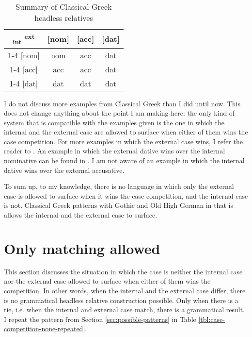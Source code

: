 \begin{table}[ht]
  \center
  \caption{Summary of Classical Greek headless relatives}
  \begin{tabular}{c|c|c|c}
    \toprule
    \textsubscript{\ac{int}} \textsuperscript{\ac{ext}}
           & [\ac{nom}]
           & [\ac{acc}]
           & [\ac{dat}]
           \\ \cmidrule{1-4}
       [\ac{nom}]
           & \ac{nom}
           & \ac{acc}
           & \ac{dat}
           \\ \cmidrule{1-4}
       [\ac{acc}]
           & \cellcolor{LG}\ac{acc}
           & \ac{acc}
           & \cellcolor{DG}\ac{dat}
           \\ \cmidrule{1-4}
       [\ac{dat}]
           & \ac{dat}
           & \ac{dat}
           & \ac{dat}
           \\
     \bottomrule
  \end{tabular}
    \label{tbl:case-competition-classical-greek}
\end{table}

I do not discuss more examples from Classical Greek than I did until now. This does not change anything about the point I am making here: the only kind of system that is compatible with the examples given is the one in which the internal and the external case are allowed to surface when either of them wins the case competition. For more examples in which the external case wins, I refer the reader to . An example in which the external dative wins over the internal nominative can be found in \citet{noussia2015}. I am not aware of an example in which the internal dative wins over the external accusative.

To sum up, to my knowledge, there is no language in which only the external case is allowed to surface when it wins the case competition, and the internal case is not. Classical Greek patterns with Gothic and Old High German in that is allows the internal and the external case to surface.



\section{Only matching allowed}\label{sec:pattern-iv}

This section discusses the situation in which the case is neither the internal case nor the external case allowed to surface when either of them wins the competition. In other words, when the internal and the external case differ, there is no grammatical headless relative construction possible. Only when there is a tie, i.e. when the internal and external case match, there is a grammatical result. I repeat the pattern from Section \ref{sec:possible-patterns} in Table \ref{tbl:case-competition-none-repeated}.

